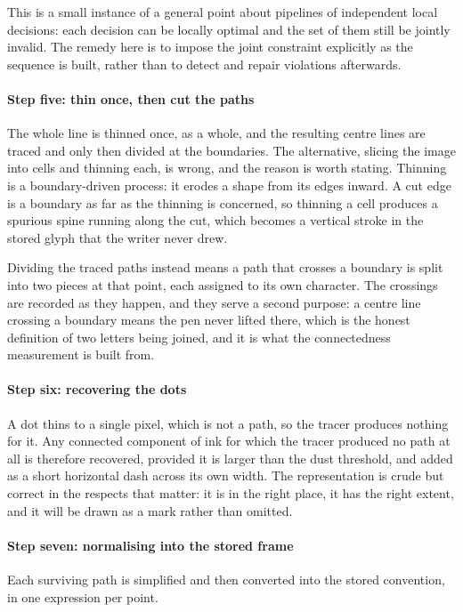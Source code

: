 This is a small instance of a general point about pipelines of independent local decisions: each decision can be locally optimal and the set of them still be jointly invalid. The remedy here is to impose the joint constraint explicitly as the sequence is built, rather than to detect and repair violations afterwards.


\paragraph{Step five: thin once, then cut the paths}
The whole line is thinned once, as a whole, and the resulting centre lines are traced and only then divided at the boundaries. The alternative, slicing the image into cells and thinning each, is wrong, and the reason is worth stating. Thinning is a boundary-driven process: it erodes a shape from its edges inward. A cut edge is a boundary as far as the thinning is concerned, so thinning a cell produces a spurious spine running along the cut, which becomes a vertical stroke in the stored glyph that the writer never drew.

Dividing the traced paths instead means a path that crosses a boundary is split into two pieces at that point, each assigned to its own character. The crossings are recorded as they happen, and they serve a second purpose: a centre line crossing a boundary means the pen never lifted there, which is the honest definition of two letters being joined, and it is what the connectedness measurement is built from.


\paragraph{Step six: recovering the dots}
A dot thins to a single pixel, which is not a path, so the tracer produces nothing for it. Any connected component of ink for which the tracer produced no path at all is therefore recovered, provided it is larger than the dust threshold, and added as a short horizontal dash across its own width. The representation is crude but correct in the respects that matter: it is in the right place, it has the right extent, and it will be drawn as a mark rather than omitted.


\paragraph{Step seven: normalising into the stored frame}
Each surviving path is simplified and then converted into the stored convention, in one expression per point.


